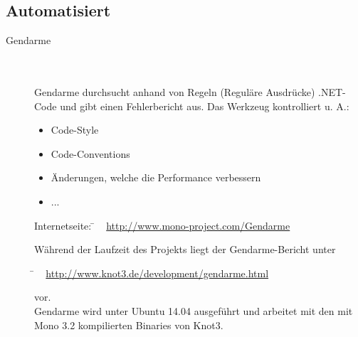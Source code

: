 
\clearpage



\subsection{Automatisiert}
\label{Abschnitt:Programmfehler:Werkzeuge:Automatisiert}



\begin{description}

	\item[Gendarme] \hfill
	\\
	\\
	Gendarme durchsucht anhand von Regeln (Reguläre Ausdrücke) .NET-Code und gibt einen Fehlerbericht aus. Das Werkzeug kontrolliert u. A.:
	\\
	
	\begin{itemize}
	
		\item Code-Style
		\item Code-Conventions
		\item Änderungen, welche die Performance verbessern
		\item ...
	
	\end{itemize}
			
	\begin{tabbing}
		Internetseite:
		\= ~ \href {http://www.mono-project.com/Gendarme}
                   {http://www.mono-project.com/Gendarme}
		\\
	\end{tabbing}
	
	Während der Laufzeit des Projekts liegt der Gendarme-Bericht unter
	\begin{tabbing}
			\= ~ \href {http://www.knot3.de/development/gendarme.html}
     			       {http://www.knot3.de/development/gendarme.html}
     			   
	\end{tabbing} vor.
	~\\
	Gendarme wird unter Ubuntu 14.04 ausgeführt und arbeitet mit den mit Mono 3.2 kompilierten Binaries von Knot3.
	
\end{description}



